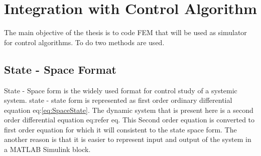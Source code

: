 \documentclass[main.tex]{subfiles}
\begin{document}

 











\section{Integration with Control Algorithm}
The main objective of the thesis is to code FEM that will be used as simulator for control algorithms. To do two methods are used. 

\subsection{State - Space Format}

State - Space form is the widely used format for control study of a systemic system. state - state form is represented as first order ordinary differential equation eq:\ref{eq:SpaceState}. The dynamic system that is present here is a second order differential equation eq:{refer eq}. This Second order equation is converted to first order equation for which it will consistent to the  state space form. The another reason is that it is easier to represent input and output of the system in a MATLAB Simulink block.  
\end{document}
